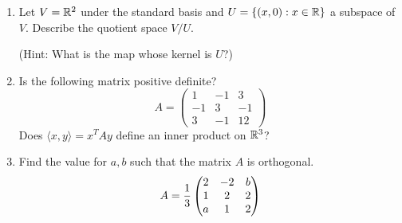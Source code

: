\documentclass{amsart}
\theoremstyle{definition}
\begin{document}
\begin{enumerate}
\item Let $V=\mathbb{R}^2$ under the standard basis and $U=\{(x,0):x\in\mathbb{R}\}$ a subspace of $V$. Describe the quotient space $V/U$. 

(Hint: What is the map whose kernel is $U$?)
%
%
\item Is the following matrix positive definite?
\[A=\begin{pmatrix}
	1&-1&3\\-1&3&-1\\3&-1&12
\end{pmatrix}\]
Does $\langle x,y\rangle =x^TAy$ define an inner product on $\mathbb{R}^3$?
\item Find the value for $a,b$ such that the matrix $A$ is orthogonal.
\[A={1\over 3}\begin{pmatrix}2&-2&b\\1&2&2\\a&1&2
\end{pmatrix}\]
\end{enumerate}


%
%
\end{document}
